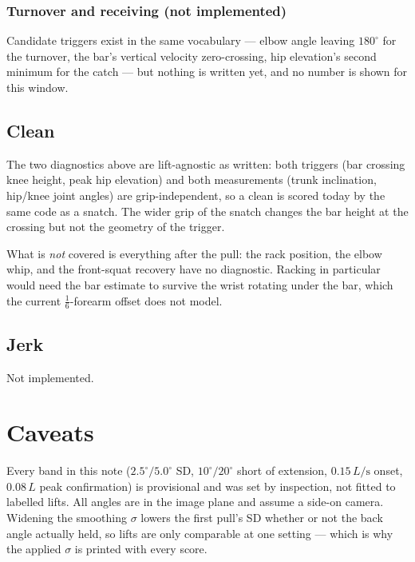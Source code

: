\documentclass[10pt,a4paper]{article}
\newcommand{\Lt}{L}                      %
\begin{document}
\subsubsection{Turnover and receiving (not implemented)}

Candidate triggers exist in the same vocabulary --- elbow angle leaving
$180^\circ$ for the turnover, the bar's vertical velocity zero-crossing, hip
elevation's second minimum for the catch --- but nothing is written yet, and no
number is shown for this window.

\subsection{Clean}

The two diagnostics above are lift-agnostic as written: both triggers (bar
crossing knee height, peak hip elevation) and both measurements (trunk
inclination, hip/knee joint angles) are grip-independent, so a clean is scored
today by the same code as a snatch. The wider grip of the snatch changes the bar
height at the crossing but not the geometry of the trigger.

What is \emph{not} covered is everything after the pull: the rack position, the
elbow whip, and the front-squat recovery have no diagnostic. Racking in
particular would need the bar estimate to survive the wrist rotating under the
bar, which the current $\tfrac{1}{6}$-forearm offset does not model.

\subsection{Jerk}

Not implemented.

\section*{Caveats}

Every band in this note ($2.5^\circ/5.0^\circ$ SD, $10^\circ/20^\circ$ short of
extension, $0.15\,\Lt/\mathrm{s}$ onset, $0.08\,\Lt$ peak confirmation) is
provisional and was set by inspection, not fitted to labelled lifts. All angles
are in the image plane and assume a side-on camera. Widening the smoothing
$\sigma$ lowers the first pull's SD whether or not the back angle actually held,
so lifts are only comparable at one setting --- which is why the applied
$\sigma$ is printed with every score.

\appendix
\end{document}
